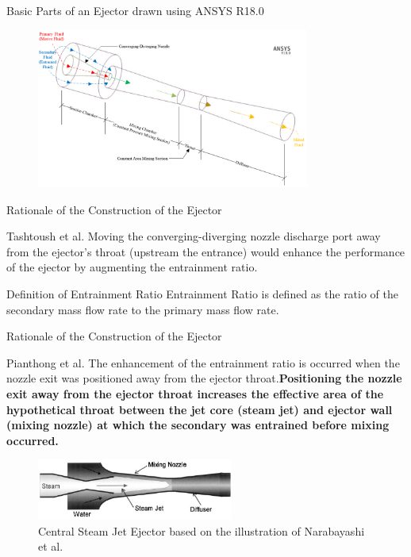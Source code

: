 \begin{frame}{Basic Parts of an Ejector drawn using ANSYS R18.0}
  \begin{figure}[h]
    \centering
   \includegraphics[height=5.25cm]{images/Ejector basic parts.PNG}
    \label{fig:ejectorparts}
  \end{figure}  
\end{frame}

\begin{frame}{Rationale of the Construction of the Ejector}
    \begin{block}{Tashtoush et al. \cite{tashtoush2019comprehensive}}
     Moving the converging-diverging nozzle discharge port away from the ejector's throat (upstream the entrance) would enhance the performance of the ejector by augmenting the entrainment ratio.
    \end{block}
    \begin{block}{Definition of Entrainment Ratio}
     Entrainment Ratio is defined as the ratio of the secondary mass flow rate to the primary mass flow rate. 
    \end{block}
\end{frame}

\begin{frame}{Rationale of the Construction of the Ejector}
    \begin{block}{Pianthong et al.\cite{pianthong2007investigation}}
     The enhancement of the entrainment ratio is occurred when the nozzle exit was positioned away from the ejector throat.\textbf{Positioning the nozzle exit away from the ejector throat increases the effective area of the hypothetical throat between the jet core (steam jet) and ejector wall (mixing nozzle) at which the secondary was entrained before mixing occurred.}
    \end{block}
    \begin{figure}
        \centering
        \includegraphics[height=2cm]{images/Central steam jet.PNG}
        \caption{\small Central Steam Jet Ejector based on the illustration of Narabayashi et al. \cite{narabayashi1997study,narabayashi2000study}}
        \label{fig:centralsteamjet}
    \end{figure}
\end{frame}

